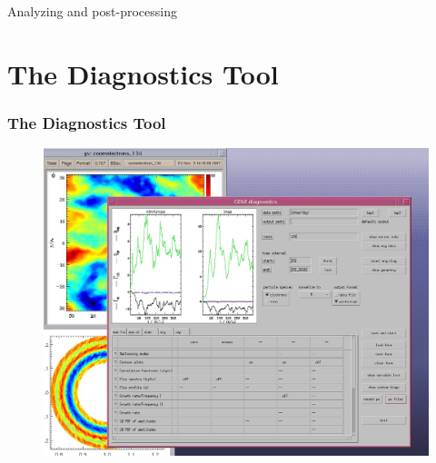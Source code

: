 \documentclass[10pt]{beamer}
\begin{document}
\begin{frame}[plain]

\begin{center}

\begin{exampleblock}

\begin{center}
\LARGE
Analyzing and post-processing%
\end{center}
\end{exampleblock}

\end{center}
\end{frame}


\section{The Diagnostics Tool}

\begin{frame}
  \frametitle{The Diagnostics Tool}

\begin{figure}
\includegraphics[height=0.6\textwidth]{figs/diag_screenshot.jpg}
\end{figure}

\end{frame}

\end{document}

